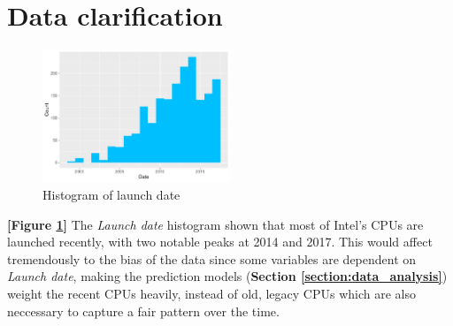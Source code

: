 %
%   
\clearpage
\section{Data clarification}
\label{section:data_clarify}










\begin{figure}[H]
    \centering
    \includegraphics[width=0.5\textwidth]{./graphics/hist_ldate.pdf}
    \caption{Histogram of launch date}
    \label{fig:hist_ldate}
\end{figure}


\textbf{[Figure \ref{fig:hist_ldate}]} The \textit{Launch date} histogram shown that most of Intel's CPUs are launched recently, 
with two notable peaks at 2014 and 2017. This would affect tremendously to the bias of the data since some variables are dependent 
on \textit{Launch date}, making the prediction models (\textbf{Section \ref{section:data_analysis}}) weight the recent CPUs heavily,
instead of old, legacy CPUs which are also neccessary to capture a fair pattern over the time.






